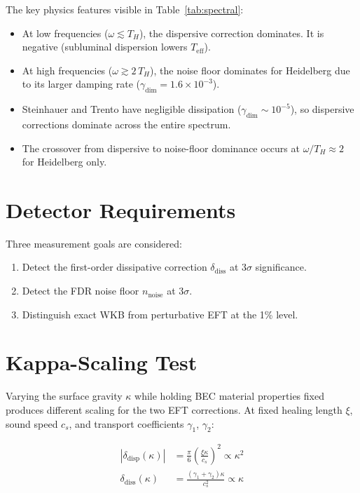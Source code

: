 \documentclass[aps,prd,twocolumn,showpacs,superscriptaddress,nofootinbib]{revtex4-2}
\begin{document}
The key physics features visible in Table~\ref{tab:spectral}:
\begin{itemize}
\item At low frequencies ($\omega \lesssim T_H$), the dispersive correction
dominates. It is negative (subluminal dispersion lowers $T_\text{eff}$).
\item At high frequencies ($\omega \gtrsim 2\,T_H$), the noise floor
dominates for Heidelberg due to its larger damping rate
($\gamma_\text{dim} = 1.6\times10^{-3}$).
\item Steinhauer and Trento have negligible dissipation
($\gamma_\text{dim} \sim 10^{-5}$), so dispersive corrections dominate
across the entire spectrum.
\item The crossover from dispersive to noise-floor dominance occurs at
$\omega/T_H \approx 2$ for Heidelberg only.
\end{itemize}

\section{Detector Requirements}

Three measurement goals are considered:
\begin{enumerate}
\item Detect the first-order dissipative correction $\delta_\text{diss}$
at 3$\sigma$ significance.
\item Detect the FDR noise floor $n_\text{noise}$ at 3$\sigma$.
\item Distinguish exact WKB from perturbative EFT at the 1\% level.
\end{enumerate}

\section{Kappa-Scaling Test}

Varying the surface gravity $\kappa$ while holding BEC material properties
fixed produces different scaling for the two EFT corrections. At fixed
healing length $\xi$, sound speed $c_s$, and transport coefficients
$\gamma_1$, $\gamma_2$:

\begin{align}
|\delta_\text{disp}(\kappa)| &= \frac{\pi}{6}\left(\frac{\xi\kappa}{c_s}\right)^2 \propto \kappa^2 \label{eq:disp_scaling} \\
\delta_\text{diss}(\kappa) &= \frac{(\gamma_1 + \gamma_2)\kappa}{c_s^2} \propto \kappa \label{eq:diss_scaling}
\end{align}
\end{document}
